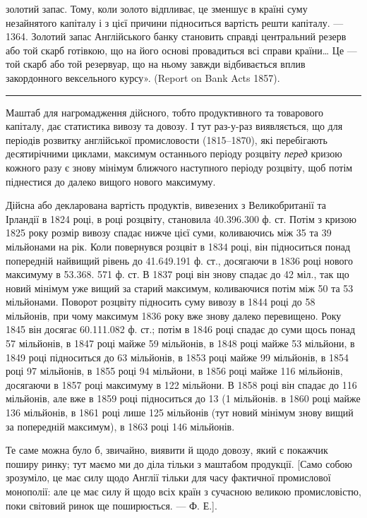\parcont{}  %
золотий запас. Тому, коли золото відпливає, це зменшує в країні суму незайнятого
капіталу і з цієї причини підноситься вартість решти капіталу. — 1364. Золотий
запас Англійського банку становить справді центральний резерв або той скарб
готівкою, що на його основі провадиться всі справи країни\dots{} Це — той скарб
або той резервуар, що на ньому завжди відбивається вплив закордонного вексельного
курсу». (Report on Bank Acts 1857).

\pfbreak

Маштаб для нагромадження дійсного, тобто продуктивного та товарового
капіталу, дає статистика вивозу та довозу. І тут раз-у-раз виявляється, що
для періодів розвитку англійської промисловости (1815--1870), які перебігають
десятирічними циклами, максимум останнього періоду розцвіту \emph{перед} кризою
кожного разу є знову мінімум ближчого наступного періоду розцвіту, щоб потім
піднестися до далеко вищого нового максимуму.

Дійсна або декларована вартість продуктів, вивезених з Великобританії та
Ірландії в 1824 році, в році розцвіту, становила 40.396.300 ф. ст. Потім з кризою
1825 року розмір вивозу спадає нижче цієї суми, коливаючись між 35 та 39 мільйонами
на рік. Коли повернувся розцвіт в 1834 році, він підноситься понад попередній
найвищий рівень до 41.649.191 ф. ст., досягаючи в 1836 році нового
максимуму в 53.368. 571 ф. ст. В 1837 році він знову спадає до 42 міл.,
так що новий мінімум уже вищий за старий максимум, коливаючися потім між
50 та 53 мільйонами. Поворот розцвіту підносить суму вивозу в 1844 році до
58 мільйонів, при чому максимум 1836 року вже знову далеко перевищено.
Року 1845 він досягає 60.111.082 ф. ст.; потім в 1846 році спадає до суми щось
понад 57 мільйонів, в 1847 році майже 59 мільйонів, в 1848 році майже 53 мільйони,
в 1849 році підноситься до 63 мільйонів, в 1853 році майже 99 мільйонів,
в 1854 році 97 мільйонів, в 1855 році 94 мільйони, в 1856 році майже
116 мільйонів, досягаючи в 1857 році максимуму в 122 мільйони. В 1858 році
він спадає до 116 мільйонів, але вже в 1859 році підноситься до 13 (1 мільйонів.
в 1860 році майже 136 мільйонів, в 1861 році лише 125 мільйонів (тут
новий мінімум знову вищий за попередній максимум), в 1863 році 146 мільйонів.

Те саме можна було б, звичайно, виявити й щодо довозу, який є покажчик
поширу ринку; тут маємо ми до діла тільки з маштабом продукції. [Само
собою зрозуміло, це має силу щодо Англії тільки для часу фактичної промислової
монополії: але це має силу й щодо всіх країн з сучасною великою промисловістю,
поки світовий ринок ще поширюється. — Ф. Е.].

